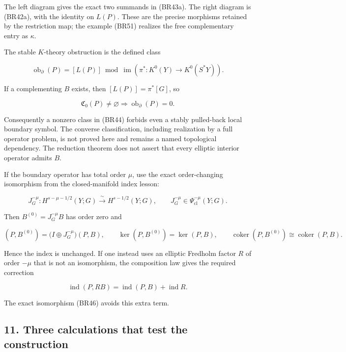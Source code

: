 \documentclass[
  11pt,
]{article}
\begin{document}
The left diagram gives the exact two summands in (BR43a). The right
diagram is (BR42a), with the identity on \(L(P)\). These are the precise
morphisms retained by the restriction map; the example (BR51) realizes
the free complementary entry as \(\kappa\).

The stable \(K\)-theory obstruction is the defined class

\[
 \operatorname{ob}_{\partial}(P)
 =[L(P)]\bmod
 \operatorname{im}\!\left(
 \pi^*:K^0(Y)\longrightarrow K^0(S^*Y)\right).
 \tag{BR44}
\]

If a complementing \(B\) exists, then \([L(P)]=\pi^*[G]\), so

\[
 \mathfrak C_0(P)\ne\varnothing
 \Longrightarrow
 \operatorname{ob}_{\partial}(P)=0 .
 \tag{BR45}
\]

Consequently a nonzero class in (BR44) forbids even a stably pulled-back
local boundary symbol. The converse classification, including
realization by a full operator problem, is not proved here and remains a
named topological dependency. The reduction theorem does not assert that
every elliptic interior operator admits \(B\).

If the boundary operator has total order \(\mu\), use the exact
order-changing isomorphism from the closed-manifold index lesson:

\[
 J_G^{-\mu}:
 H^{s-\mu-1/2}(Y;G)
 \xrightarrow{\ \sim\ }
 H^{s-1/2}(Y;G),
 \qquad
 J_G^{-\mu}\in\Psi_{\mathrm{cl}}^{-\mu}(Y;G).
 \tag{BR46}
\]

Then \(B^{(0)}=J_G^{-\mu}B\) has order zero and

\[
 (P,B^{(0)})
 =\bigl(I\oplus J_G^{-\mu}\bigr)(P,B),
 \qquad
 \ker(P,B^{(0)})=\ker(P,B),
 \qquad
 \operatorname{coker}(P,B^{(0)})\cong\operatorname{coker}(P,B).
 \tag{BR47}
\]

Hence the index is unchanged. If one instead uses an elliptic Fredholm
factor \(R\) of order \(-\mu\) that is not an isomorphism, the
composition law gives the required correction

\[
 \operatorname{ind}(P,RB)
 =\operatorname{ind}(P,B)+\operatorname{ind}R .
 \tag{BR48}
\]

The exact isomorphism (BR46) avoids this extra term.

\subsection{11. Three calculations that test the
construction}\label{three-calculations-that-test-the-construction}
\end{document}
